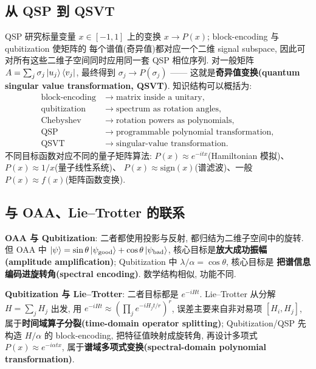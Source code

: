 \documentclass[utf8]{article} %
\numberwithin{equation}{section}   %
\begin{document}
\subsection{从 QSP 到 QSVT}

QSP 研究标量变量 $x \in [-1,1]$ 上的变换 $x \to P(x)$; block-encoding 与 qubitization 使矩阵的
每个谱值(奇异值)都对应一个二维 signal subspace, 因此可对所有这些二维子空间同时应用同一套
QSP 相位序列. 对一般矩阵 $A = \sum_j \sigma_j \ket{u_j}\bra{v_j}$, 最终得到
$\sigma_j \to P(\sigma_j)$ —— 这就是\textbf{奇异值变换(quantum singular value transformation, QSVT)}.
知识结构可以概括为:
\begin{equation}
    \begin{aligned}
        \text{block-encoding} &\to \text{matrix inside a unitary},\\
        \text{qubitization} &\to \text{spectrum as rotation angles},\\
        \text{Chebyshev} &\to \text{rotation powers as polynomials},\\
        \text{QSP} &\to \text{programmable polynomial transformation},\\
        \text{QSVT} &\to \text{singular-value transformation}.
    \end{aligned}
\end{equation}
不同目标函数对应不同的量子矩阵算法:
$P(x) \approx e^{-itx}$(Hamiltonian 模拟)、$P(x) \approx 1/x$(量子线性系统)、
$P(x) \approx \mathrm{sign}(x)$(谱滤波)、一般 $P(x) \approx f(x)$(矩阵函数变换).

\subsection{与 OAA、Lie--Trotter 的联系}

\textbf{OAA 与 Qubitization}: 二者都使用投影与反射, 都归结为二维子空间中的旋转. 但 OAA 中
$\ket{\psi} = \sin\theta\ket{\psi_{\mathrm{good}}} + \cos\theta\ket{\psi_{\mathrm{bad}}}$,
核心目标是\textbf{放大成功振幅(amplitude amplification)};
Qubitization 中 $\lambda/\alpha = \cos\theta$, 核心目标是
\textbf{把谱信息编码进旋转角(spectral encoding)}. 数学结构相似, 功能不同.

\textbf{Qubitization 与 Lie--Trotter}: 二者目标都是 $e^{-iHt}$. Lie--Trotter 从分解
$H = \sum_j H_j$ 出发, 用 $e^{-iHt} \approx (\prod_j e^{-iH_jt/r})^r$, 误差主要来自非对易项
$[H_i, H_j]$, 属于\textbf{时间域算子分裂(time-domain operator splitting)};
Qubitization/QSP 先构造 $H/\alpha$ 的 block-encoding, 把特征值映射成旋转角, 再设计多项式
$P(x) \approx e^{-i\alpha tx}$, 属于\textbf{谱域多项式变换(spectral-domain polynomial transformation)}.
\end{document}
